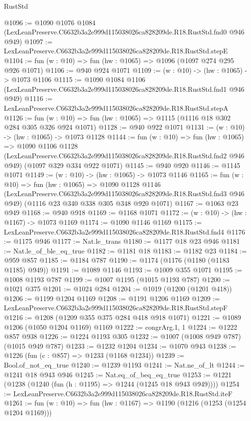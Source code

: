 \begin{lexlean}{RustStd}
\begin{coremodule}
@1096 := @1090
    @1076
    @1084
    (LexLeanPreserve.C6632b3a2e999d115038026ca828209de.R18.RustStd.fnd0 @946 @949)
@1097 := LexLeanPreserve.C6632b3a2e999d115038026ca828209de.R18.RustStd.stepE
@1104 := fun (w : @10) => fun (hw : @1065) => @1096 (@1097 @274 @295 @926 @1071)
@1106 := @940 @924 @1071
@1109 := (w : @10) -> (hw : @1065) -> @1073 @1106
@1115 := @1090
    @1084
    @1106
    (LexLeanPreserve.C6632b3a2e999d115038026ca828209de.R18.RustStd.fnd1 @946 @949)
@1116 := LexLeanPreserve.C6632b3a2e999d115038026ca828209de.R18.RustStd.stepA
@1126 := fun (w : @10) => fun (hw : @1065) => @1115 (@1116 @18 @302 @284 @305 @326 @924 @1071)
@1128 := @940 @922 @1071
@1131 := (w : @10) -> (hw : @1065) -> @1073 @1128
@1144 := fun (w : @10) =>
  fun (hw : @1065) =>
  @1090
    @1106
    @1128
    (LexLeanPreserve.C6632b3a2e999d115038026ca828209de.R18.RustStd.fnd2 @946 @949)
    (@1097 @329 @334 @922 @1071)
@1145 := @940 @920
@1146 := @1145 @1071
@1149 := (w : @10) -> (hw : @1065) -> @1073 @1146
@1165 := fun (w : @10) =>
  fun (hw : @1065) =>
  @1090
    @1128
    @1146
    (LexLeanPreserve.C6632b3a2e999d115038026ca828209de.R18.RustStd.fnd3 @946 @949)
    (@1116 @23 @340 @338 @305 @348 @920 @1071)
@1167 := @1063 @23 @949
@1168 := @940 @918
@1169 := @1168 @1071
@1172 := (w : @10) -> (hw : @1167) -> @1073 @1169
@1174 := @1090 @1146 @1169
@1175 := LexLeanPreserve.C6632b3a2e999d115038026ca828209de.R18.RustStd.fnd4
@1176 := @1175 @946
@1177 := Nat.le_trans
@1180 := @1177 @18 @23 @946
@1181 := Nat.le_of_ble_eq_true
@1182 := @1181 @18
@1183 := @1182 @23
@1184 := @959 @857
@1185 := @1184 @787
@1190 := @1174 (@1176 (@1180 (@1183 @1185) @949))
@1191 := @1089 @1146
@1193 := @1009 @355 @1071
@1195 := @1008 @1193 @787
@1199 := @1007 @1195 (@1015 @1193 @787)
@1200 := @1021 @375
@1201 := @1024 @284
@1204 := @1019 (@1200 (@1201 @418))
@1206 := @1199 @1204 @1169
@1208 := @1191 @1206 @1169
@1209 := LexLeanPreserve.C6632b3a2e999d115038026ca828209de.R18.RustStd.stepF
@1216 := @1208 (@1209 @355 @375 @284 @418 @918 @1071)
@1221 := @1089 @1206 (@1050 @1204 @1169) @1169
@1222 := congrArg.{1, 1}
@1224 := @1222 @857 @938
@1226 := @1224 @1193 @305
@1232 := @1007 (@1008 @949 @787) (@1015 @949 @787)
@1233 := @1232 @1204
@1234 := @1070 @943
@1238 := @1226 (fun (c : @857) => @1233 (@1168 @1234))
@1239 := Bool.of_not_eq_true
@1240 := @1239 @1193
@1241 := Nat.ne_of_lt
@1244 := @1241 @18 @943 @946
@1245 := Nat.eq_of_beq_eq_true
@1253 := @1221 (@1238 (@1240 (fun (h : @1195) => @1244 (@1245 @18 @943 @949))))
@1254 := LexLeanPreserve.C6632b3a2e999d115038026ca828209de.R18.RustStd.iteF
@1261 := fun (w : @10) => fun (hw : @1167) => @1190 (@1216 (@1253 (@1254 @1204 @1169)))

\end{coremodule}
\end{lexlean}
